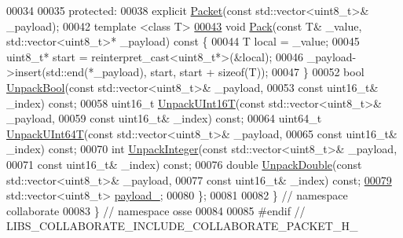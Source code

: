 \begin{DoxyCode}
00034 
00035  \textcolor{keyword}{protected}:
00038   \textcolor{keyword}{explicit} \hyperlink{classosse_1_1collaborate_1_1_packet_aecb3018048e1845ea9e45dcd008cc0df}{Packet}(\textcolor{keyword}{const} std::vector<uint8\_t>& \_payload);
00042   \textcolor{keyword}{template} <\textcolor{keyword}{class} T>
\hyperlink{classosse_1_1collaborate_1_1_packet_a7ebfc5903ba6bf302e2f4a33340e7155}{00043}   \textcolor{keywordtype}{void} \hyperlink{classosse_1_1collaborate_1_1_packet_a7ebfc5903ba6bf302e2f4a33340e7155}{Pack}(\textcolor{keyword}{const} T& \_value, std::vector<uint8\_t>* \_payload)\textcolor{keyword}{ const }\{
00044     T local = \_value;
00045     uint8\_t* start = \textcolor{keyword}{reinterpret\_cast<}uint8\_t*\textcolor{keyword}{>}(&local);
00046     \_payload->insert(std::end(*\_payload), start, start + \textcolor{keyword}{sizeof}(T));
00047   \}
00052   \textcolor{keywordtype}{bool} \hyperlink{classosse_1_1collaborate_1_1_packet_acf78e5e563ba07643fb1969dc332b1fb}{UnpackBool}(\textcolor{keyword}{const} std::vector<uint8\_t>& \_payload,
00053                   \textcolor{keyword}{const} uint16\_t& \_index) \textcolor{keyword}{const};
00058   uint16\_t \hyperlink{classosse_1_1collaborate_1_1_packet_a454166985d9b63b553cb6174417c4dde}{UnpackUInt16T}(\textcolor{keyword}{const} std::vector<uint8\_t>& \_payload,
00059                          \textcolor{keyword}{const} uint16\_t& \_index) \textcolor{keyword}{const};
00064   uint64\_t \hyperlink{classosse_1_1collaborate_1_1_packet_ab84b122670543d85df644041129568df}{UnpackUInt64T}(\textcolor{keyword}{const} std::vector<uint8\_t>& \_payload,
00065                          \textcolor{keyword}{const} uint16\_t& \_index) \textcolor{keyword}{const};
00070   \textcolor{keywordtype}{int} \hyperlink{classosse_1_1collaborate_1_1_packet_a7c786b41b594b51377b0a70ce3a61259}{UnpackInteger}(\textcolor{keyword}{const} std::vector<uint8\_t>& \_payload,
00071                     \textcolor{keyword}{const} uint16\_t& \_index) \textcolor{keyword}{const};
00076   \textcolor{keywordtype}{double} \hyperlink{classosse_1_1collaborate_1_1_packet_aa7678be22b45d54b28f1b85594638d60}{UnpackDouble}(\textcolor{keyword}{const} std::vector<uint8\_t>& \_payload,
00077                       \textcolor{keyword}{const} uint16\_t& \_index) \textcolor{keyword}{const};
\hyperlink{classosse_1_1collaborate_1_1_packet_a1917bbaba5a0fb4757947d2626287410}{00079}   std::vector<uint8\_t> \hyperlink{classosse_1_1collaborate_1_1_packet_a1917bbaba5a0fb4757947d2626287410}{payload\_};
00080 \};
00081 
00082 \}  \textcolor{comment}{// namespace collaborate}
00083 \}  \textcolor{comment}{// namespace osse}
00084 
00085 \textcolor{preprocessor}{#endif  // LIBS\_COLLABORATE\_INCLUDE\_COLLABORATE\_PACKET\_H\_}
\end{DoxyCode}

